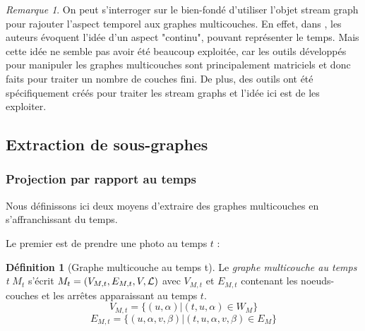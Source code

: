 \documentclass[11pt,a4paper]{article}
\theoremstyle{definition}
\newtheorem{defn}{Définition}
\theoremstyle{remark}
\newtheorem{rmq}{Remarque}
\theoremstyle{remark}
\def \stg {stream graph}
\def \stgs {stream graphs}
\begin{document}
	\begin{rmq}
		On peut s'interroger sur le bien-fondé d'utiliser l'objet \stg{} pour rajouter l'aspect temporel aux graphes multicouches. En effet, dans \cite{mlkiv}, les auteurs évoquent l'idée d'un aspect "continu", pouvant représenter le temps. Mais cette idée ne semble pas avoir été beaucoup exploitée, car les outils développés pour manipuler les graphes multicouches sont principalement matriciels et donc faits pour traiter un nombre de couches fini. De plus, des outils ont été spécifiquement créés pour traiter les \stgs{} et l'idée ici est de les exploiter.
	
	\end{rmq}

\subsection{Extraction de sous-graphes}
\label{sousgraphes}
\subsubsection{Projection par rapport au temps}
	Nous définissons ici deux moyens d'extraire des graphes multicouches en s'affranchissant du temps.
	
	Le premier est de \og prendre une photo \fg{} au temps $t$ :
	\begin{defn}[Graphe multicouche au temps t]
   	Le {\em graphe multicouche au temps t} $M_t$ s'écrit $M_t = (V_{M,t}, E_{M,t},V,{\cal L})$ avec $V_{M,t}$ et $E_{M,t}$ contenant les noeuds-couches et les arrêtes apparaissant au temps $t$.
   	$$ V_{M,t} = \{ (u,\alpha) | (t,u,\alpha) \in W_M\} $$
   	$$ E_{M,t} = \{(u,\alpha,v,\beta) | (t,u,\alpha,v,\beta) \in E_M\}$$

   \end{defn}
\end{document}
